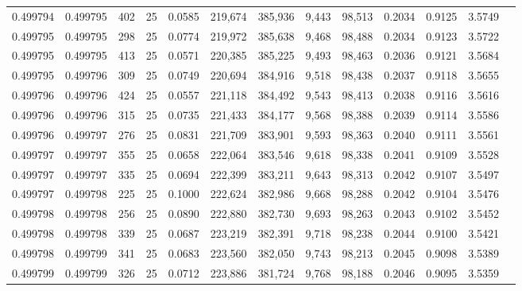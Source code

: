 \begin{tabular}{rrrrrrrrrrrrr}
0.499794 & 0.499795 &   402 &  25 &                                     0.0585 & 219,674 & 385,936 &   9,443 &  98,513 & 0.2034 & 0.9125 & 3.5749 \\
0.499795 & 0.499795 &   298 &  25 &                                     0.0774 & 219,972 & 385,638 &   9,468 &  98,488 & 0.2034 & 0.9123 & 3.5722 \\
0.499795 & 0.499795 &   413 &  25 &                                     0.0571 & 220,385 & 385,225 &   9,493 &  98,463 & 0.2036 & 0.9121 & 3.5684 \\
0.499795 & 0.499796 &   309 &  25 &                                     0.0749 & 220,694 & 384,916 &   9,518 &  98,438 & 0.2037 & 0.9118 & 3.5655 \\
0.499796 & 0.499796 &   424 &  25 &                                     0.0557 & 221,118 & 384,492 &   9,543 &  98,413 & 0.2038 & 0.9116 & 3.5616 \\
0.499796 & 0.499796 &   315 &  25 &                                     0.0735 & 221,433 & 384,177 &   9,568 &  98,388 & 0.2039 & 0.9114 & 3.5586 \\
0.499796 & 0.499797 &   276 &  25 &                                     0.0831 & 221,709 & 383,901 &   9,593 &  98,363 & 0.2040 & 0.9111 & 3.5561 \\
0.499797 & 0.499797 &   355 &  25 &                                     0.0658 & 222,064 & 383,546 &   9,618 &  98,338 & 0.2041 & 0.9109 & 3.5528 \\
0.499797 & 0.499797 &   335 &  25 &                                     0.0694 & 222,399 & 383,211 &   9,643 &  98,313 & 0.2042 & 0.9107 & 3.5497 \\
0.499797 & 0.499798 &   225 &  25 &                                     0.1000 & 222,624 & 382,986 &   9,668 &  98,288 & 0.2042 & 0.9104 & 3.5476 \\
0.499798 & 0.499798 &   256 &  25 &                                     0.0890 & 222,880 & 382,730 &   9,693 &  98,263 & 0.2043 & 0.9102 & 3.5452 \\
0.499798 & 0.499798 &   339 &  25 &                                     0.0687 & 223,219 & 382,391 &   9,718 &  98,238 & 0.2044 & 0.9100 & 3.5421 \\
0.499798 & 0.499799 &   341 &  25 &                                     0.0683 & 223,560 & 382,050 &   9,743 &  98,213 & 0.2045 & 0.9098 & 3.5389 \\
0.499799 & 0.499799 &   326 &  25 &                                     0.0712 & 223,886 & 381,724 &   9,768 &  98,188 & 0.2046 & 0.9095 & 3.5359 \\

\end{tabular}
